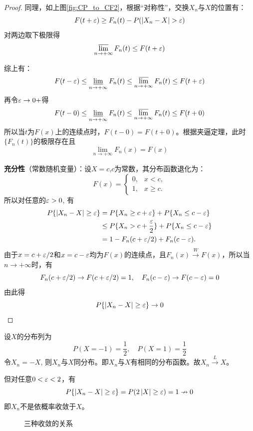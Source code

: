 \begin{proof}
    同理，如上图\ref{fig:CP_to_CF2}，根据“对称性”，交换$X_n$与$X$的位置有：
    \[ F(t+\varepsilon) \ge F_n(t) - P(\left\vert X_n-X \right\vert >\varepsilon)\]
    对两边取下极限得
    \[ \varlimsup_{n \to +\infty} F_n(t) \leq  F(t+\varepsilon) \]

    综上有：
    \[ F(t-\varepsilon) \leq \varliminf_{n \to +\infty} F_n(t) \le \varlimsup_{n \to +\infty} F_n(t) \leq  F(t+\varepsilon) \]
    再令$\varepsilon \to 0+$得
    \[ F(t-0) \leq \varliminf_{n \to +\infty} F_n(t) \le \varlimsup_{n \to +\infty} F_n(t) \leq  F(t+0) \]
    所以当$t$为$F(x)$上的连续点时，$F(t-0)=F(t+0)$。根据夹逼定理，此时$\{ F_n(t) \}$的极限存在且
    \[ \lim_{n \to +\infty} F_n(x) = F(x) \]

    \textbf{充分性}（常数随机变量）：设$X=c$,$c$为常数，其分布函数退化为：
    \[ F(x) = \begin{cases}
            0, & x < c,    \\
            1, & x \geq c.
        \end{cases} \]
    所以对任意的$\varepsilon > 0$, 有
    \begin{align*}
        P\{ \left\vert X_n-X \right\vert \ge \varepsilon \} & = P\{ X_n \geq c + \varepsilon \} + P\{ X_n \le  c - \varepsilon \}           \\
                                                   & \leq P\{ X_n > c + \frac{\varepsilon}{2} \} + P\{ X_n \le  c - \varepsilon \} \\
                                                   & = 1 - F_n(c + \varepsilon / 2 ) + F_n(c - \varepsilon ).
    \end{align*}
    由于$x = c + \varepsilon / 2$和$x = c - \varepsilon$均为$F(x)$的连续点，且$F_n(x) \stackrel{W}{\to} F(x)$，所以当$n \to +\infty$时，有
    \[ F_n(c + \varepsilon / 2 ) \to F(c + \varepsilon / 2 ) = 1, \quad F_n(c - \varepsilon) \to F(c - \varepsilon ) = 0 \]
    由此得
    \[ P\{ \left\vert X_n-X \right\vert \ge \varepsilon \} \to 0 \]
\end{proof}

\begin{example}[依分布收敛而不依概率收敛]
    设$X$的分布列为
    \[ P(X = -1 ) = \frac1{2}, \quad P(X = 1) = \frac1{2} \]
    令$X_n = -X$, 则$X_n$与$X$同分布。即$X_n$与$X$有相同的分布函数。故$X_n \stackrel{L}{\to} X$。

    但对任意$0 < \varepsilon < 2$，有
    \[ P\{ \left\vert X_n-X \right\vert \ge \varepsilon \} = P(2 \left\vert X \right\vert \geq \varepsilon ) = 1 \nrightarrow 0 \]
    即$X_n$不是依概率收敛于$X$。
\end{example}

\begin{figure}[H]
    \centering
    \caption{三种收敛的关系}
    \label{fig:relationship_among_converges}
\end{figure}

